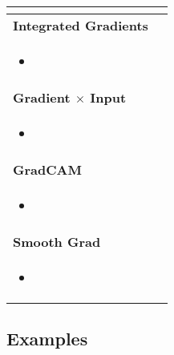 \begin{summary}
\begin{center}
\begin{tabular}{ll}
{\begin{itemize}
            \end{itemize}} \\
            \midrule
            \textbf{Integrated Gradients} & \\
            \multicolumn{2}{p{\linewidth}}{
            \begin{itemize}
                \item 
            \end{itemize}} \\
            \midrule
            \textbf{Gradient $\times$ Input} & \\
            \multicolumn{2}{p{\linewidth}}{
            \begin{itemize}
                \item 
            \end{itemize}} \\
            \midrule
            \textbf{GradCAM} & \\
            \multicolumn{2}{p{\linewidth}}{
            \begin{itemize}
                \item 
            \end{itemize}} \\
            \midrule
            \textbf{Smooth Grad} & \\
            \multicolumn{2}{p{\linewidth}}{
            \begin{itemize}
                \item 
            \end{itemize}} \\
            \bottomrule
        \end{tabular}
    \end{center}
\end{summary}

\subsection{Examples}
